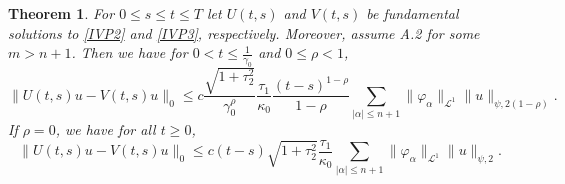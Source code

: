 \documentclass[a4paper, 12pt]{report}
\newtheorem{theorem}{Theorem}[section]
\theoremstyle{remark}
\theoremstyle{definition}
\begin{document}
\begin{theorem}
For $0 \le s \le t \le T$ let $U(t, s)$ and $V(t, s)$ be fundamental solutions to \eqref{IVP2} and \eqref{IVP3}, respectively.  Moreover, assume A.2 for some $m > n + 1$.  Then we have for $0 < t \le \frac{1}{\gamma_0}$ and $0 \le \rho < 1$,
\begin{equation}
\|U(t, s)u - V(t, s)u\|_0 \le c\frac{\sqrt{1 + \tau_2^2}}{\gamma_0^\rho}\frac{\tau_1}{\kappa_0}\frac{(t - s)^{1 - \rho}}{1 - \rho}\sum_{|\alpha| \le n + 1}\|\varphi_\alpha\|_{\mathcal{L}^1}\|u\|_{\psi, 2(1 - \rho)}.
\end{equation}
If $\rho = 0$, we have for all $t \ge 0$,
\begin{equation}
\|U(t, s)u - V(t, s)u\|_0 \le c(t - s)\sqrt{1 + \tau_2^2}\frac{\tau_1}{\kappa_0}\sum_{|\alpha| \le n + 1}\|\varphi_\alpha\|_{\mathcal{L}^1}\|u\|_{\psi, 2}.
\end{equation}
\end{theorem}
\end{document}
